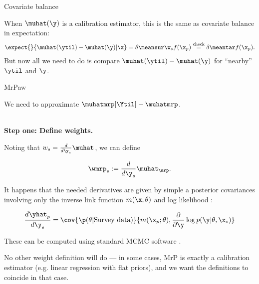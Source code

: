

\begin{frame}[t]{Covariate balance}



When $\muhat(\y)$ is a calibration estimator, this is the same as covariate balance
in expectation:
$$
\begin{aligned}
    \expect{}{\muhat(\ytil) - \muhat(\y) | \x} =
    \delta \meansur \w_s f(\x_p) \overset{\textrm{check}}{=}
        \delta \meantar f(\x_p).
\end{aligned}
$$
%
But now all we need to do is compare $\muhat(\ytil) - \muhat(\y)$ for
``nearby'' $\ytil$ and $\y$.



\end{frame}







\begin{frame}[t]{MrPaw}

We need to approximate $\muhatmrp[\Ytil] - \muhatmrp$.

\vspace{1em}
\hrulefill\\
\textbf{Step one: Define weights.}

Noting that $w_s = \frac{d}{d \y_s} \muhat_{\cal}$, we can define

$$
\wmrp_s := \frac{d}{d\y_s} \muhat_{\mrp}. %
$$

It happens that the needed derivatives are given
by simple a posterior covariances involving only the inverse
link function $m(\x; \theta)$ and
log likelihood \parencite{giordano:2018:covariances}:

$$
\frac{d \yhat_p}{d\y_s}  =
    \cov{\p(\theta \vert \textrm{Survey data})}{
        m(\x_p; \theta),
        \frac{\partial}{\partial \y} \log p(\y \vert \theta, \x_s)}
$$

These can be computed using standard MCMC software \parencite{brms}.

No other weight definition will do --- in some cases,
MrP is exactly a calibration estimator (e.g. linear regression with flat priors),
and we want the definitions to coincide in that case.

\end{frame}



